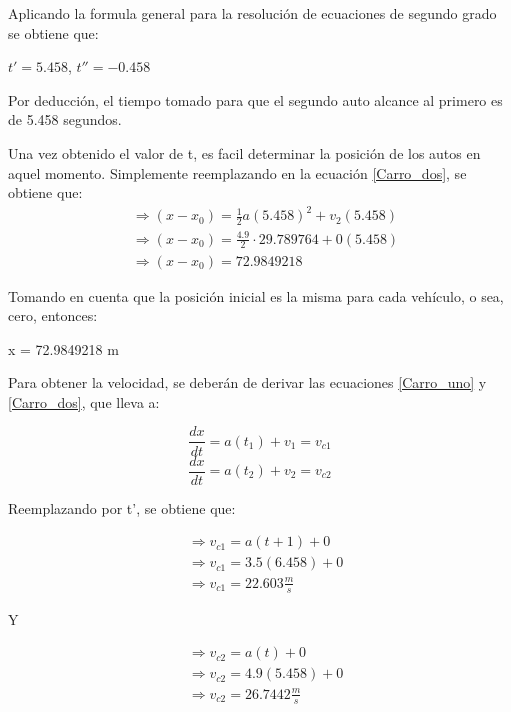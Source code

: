 \documentclass[letterpaper, 12pt]{article}
\begin{document}
\begin{itemize}
Aplicando la formula general para la resoluci\'on de ecuaciones de segundo grado se obtiene que:

\begin{center}
    $t' = 5.458$,  $t'' = -0.458$
\end{center}

Por deducci\'on, el tiempo tomado para que el segundo auto alcance al primero es de 5.458 segundos.

Una vez obtenido el valor de t, es facil determinar la posici\'on de los autos en aquel momento. Simplemente reemplazando en la ecuaci\'on \ref{Carro_dos}, se obtiene que:
 \begin{align*}
     &\Rightarrow (x-x_0) = \frac{1}{2}a(5.458)^2 + v_2(5.458) \\
     &\Rightarrow (x-x_0) = \frac{4.9}{2}\cdot 29.789764 + 0(5.458) \\
     &\Rightarrow (x-x_0) = 72.9849218
 \end{align*}

 Tomando en cuenta que la posici\'on inicial es la misma para cada veh\'iculo, o sea, cero, entonces:

 \begin{center}
     x = 72.9849218 m
 \end{center}

 Para obtener la velocidad, se deber\'an de derivar las ecuaciones \ref{Carro_uno} y \ref{Carro_dos}, que lleva a:

 \begin{equation}
 \label{velocidad_carro_uno}
     \frac{dx}{dt} = a(t_1) + v_1 = v_{c1}
 \end{equation}
 \begin{equation}
 \label{velocidad_carro_dos}
     \frac{dx}{dt} = a(t_2) + v_2 = v_{c2}
 \end{equation}

Reemplazando por t', se obtiene que:

\begin{align*}
   &\Rightarrow v_{c1} = a(t+1) + 0 \\
   &\Rightarrow v_{c1} = 3.5(6.458) + 0 \\
   &\Rightarrow v_{c1} = 22.603 \frac{m}{s}
\end{align*}

Y

\begin{align*}
   &\Rightarrow v_{c2} = a(t) + 0 \\
   &\Rightarrow v_{c2} = 4.9(5.458) + 0 \\
   &\Rightarrow v_{c2} = 26.7442 \frac{m}{s}
\end{align*}



\end{itemize}
\end{document}
